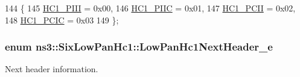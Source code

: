 \begin{DoxyCode}
144   \{
145     \hyperlink{classns3_1_1SixLowPanHc1_a29c864d9bf6bc466ee2214a95a83dcada33fbbb35ed064759434a773a85d2d325}{HC1\_PIII} = 0x00,
146     \hyperlink{classns3_1_1SixLowPanHc1_a29c864d9bf6bc466ee2214a95a83dcada8e07a41c91e304c47d01515d51d399ca}{HC1\_PIIC} = 0x01,
147     \hyperlink{classns3_1_1SixLowPanHc1_a29c864d9bf6bc466ee2214a95a83dcada3b9d64b07cd392302c87ed69164f0793}{HC1\_PCII} = 0x02,
148     \hyperlink{classns3_1_1SixLowPanHc1_a29c864d9bf6bc466ee2214a95a83dcada2e3b9656c8f4d8912d0bf078533e298f}{HC1\_PCIC} = 0x03
149   \};
\end{DoxyCode}
\subsubsection[{\texorpdfstring{Low\+Pan\+Hc1\+Next\+Header\+\_\+e}{LowPanHc1NextHeader_e}}]{\setlength{\rightskip}{0pt plus 5cm}enum {\bf ns3\+::\+Six\+Low\+Pan\+Hc1\+::\+Low\+Pan\+Hc1\+Next\+Header\+\_\+e}}\hypertarget{classns3_1_1SixLowPanHc1_a685a2989be331260334b9ae653624cba}{}\label{classns3_1_1SixLowPanHc1_a685a2989be331260334b9ae653624cba}


Next header information. 

